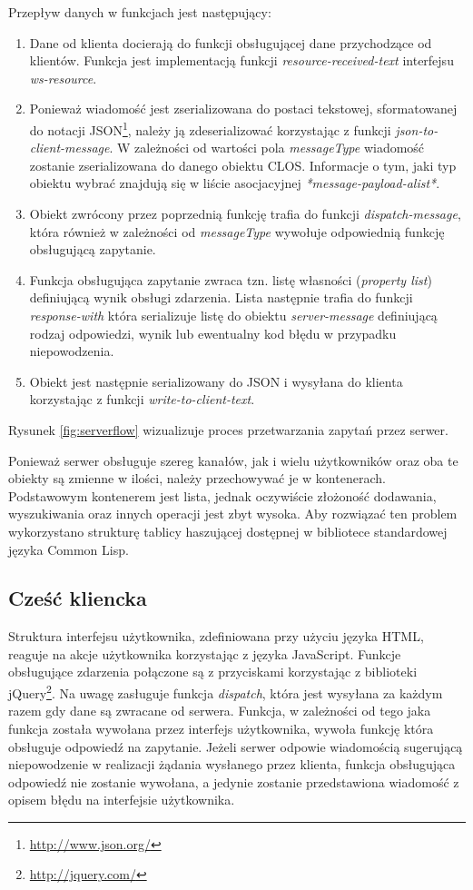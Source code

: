 Przepływ danych w funkcjach jest następujący:
\begin{enumerate}
\item Dane od klienta docierają do funkcji obsługującej dane przychodzące od klientów. Funkcja jest implementacją funkcji \emph{resource-received-text} interfejsu \emph{ws-resource}.
\item Ponieważ wiadomość jest zserializowana do postaci tekstowej, sformatowanej do notacji JSON\footnote{\url{http://www.json.org/}}, należy ją zdeserializować korzystając z funkcji \emph{json-to-client-message}. W zależności od wartości pola \emph{messageType} wiadomość zostanie zserializowana do danego obiektu CLOS. Informacje o tym, jaki typ obiektu wybrać znajdują się w liście asocjacyjnej \emph{*message-payload-alist*}.
\item Obiekt zwrócony przez poprzednią funkcję trafia do funkcji \emph{dispatch-message}, która również w zależności od \emph{messageType} wywołuje odpowiednią funkcję obsługującą zapytanie.
\item Funkcja obsługująca zapytanie zwraca tzn. listę własności (\emph{property list}) definiującą wynik obsługi zdarzenia. Lista następnie trafia do funkcji \emph{response-with} która serializuje listę do obiektu \emph{server-message} definiującą rodzaj odpowiedzi, wynik lub ewentualny kod błędu w przypadku niepowodzenia.
\item Obiekt jest następnie serializowany do JSON i wysyłana do klienta korzystając z funkcji \emph{write-to-client-text}.
\label{clflow}
\end{enumerate}
Rysunek \ref{fig:serverflow} wizualizuje proces przetwarzania zapytań przez serwer.

Ponieważ serwer obsługuje szereg kanałów, jak i wielu użytkowników oraz oba te obiekty są zmienne w ilości, należy przechowywać je w kontenerach. Podstawowym kontenerem jest lista, jednak oczywiście złożoność dodawania, wyszukiwania oraz innych operacji jest zbyt wysoka. Aby rozwiązać ten problem wykorzystano strukturę tablicy haszującej dostępnej w bibliotece standardowej języka Common Lisp.

\subsection{Cześć kliencka}
Struktura interfejsu użytkownika, zdefiniowana przy użyciu języka HTML, reaguje na akcje użytkownika korzystając z języka JavaScript. Funkcje obsługujące zdarzenia połączone są z przyciskami korzystając z biblioteki jQuery\footnote{\url{http://jquery.com/}}. Na uwagę zasługuje funkcja \emph{dispatch}, która jest wysyłana za każdym razem gdy dane są zwracane od serwera. Funkcja, w zależności od tego jaka funkcja została wywołana przez interfejs użytkownika, wywoła funkcję która obsługuje odpowiedź na zapytanie. Jeżeli serwer odpowie wiadomością sugerującą niepowodzenie w realizacji żądania wysłanego przez klienta, funkcja obsługująca odpowiedź nie zostanie wywołana, a jedynie zostanie przedstawiona wiadomość z opisem błędu na interfejsie użytkownika.

